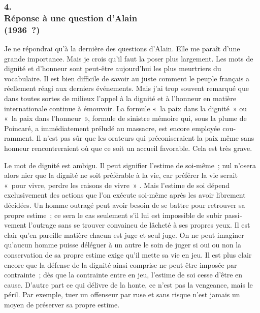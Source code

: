 \documentclass[french,twoside]{book} %
\begin{document}
\subsubsection[4. Réponse à une question d’Alain  (1936 ?)]{4. \\
Réponse à une question d’Alain \protect\footnotemark  \\
(1936 ?)}
\noindent \par
Je ne répondrai qu'à la dernière des questions d'Alain. Elle me paraît d'une grande importance. Mais je crois qu'il faut la poser plus largement. Les mots de dignité et d'honneur sont peut-être aujourd'hui les plus meurtriers du vocabulaire. Il est bien difficile de savoir au juste comment le peuple français a réellement réagi aux derniers événements. Mais j'ai trop souvent remarqué que dans toutes sortes de milieux l'appel à la dignité et à l'honneur en matière internationale continue à émouvoir. La formule « la paix dans la dignité » ou « la paix dans l'honneur », formule de sinistre mémoire qui, sous la plume de Poincaré, a immédiatement préludé au massacre, est encore employée cou­ramment. Il n'est pas sûr que les orateurs qui préconiseraient la paix même sans honneur rencontreraient où que ce soit un accueil favorable. Cela est très grave.\par
Le mot de dignité est ambigu. Il peut signifier l'estime de soi-même ; nul n'osera alors nier que la dignité ne soit préférable à la vie, car préférer la vie serait « pour vivre, perdre les raisons de vivre » . Mais l'estime de soi dépend exclusivement des actions que l'on exécute soi-même après les avoir librement décidées. Un homme outragé peut avoir besoin de se battre pour retrouver sa propre estime ; ce sera le cas seulement s'il lui est impossible de subir passi­vement l'outrage sans se trouver convaincu de lâcheté à ses propres yeux. Il est clair qu'en pareille matière chacun est juge et seul juge. On ne peut imaginer qu'aucun homme puisse déléguer à un autre le soin de juger si oui ou non la conservation de sa propre estime exige qu'il mette sa vie en jeu. Il est plus clair encore que la défense de la dignité ainsi comprise ne peut être imposée par contrainte ; dès que la contrainte entre en jeu, l'estime de soi cesse d'être en cause. D'autre part ce qui délivre de la honte, ce n'est pas la vengeance, mais le péril. Par exemple, tuer un offenseur par ruse et sans risque n'est jamais un moyen de préserver sa propre estime.\par
\end{document}
